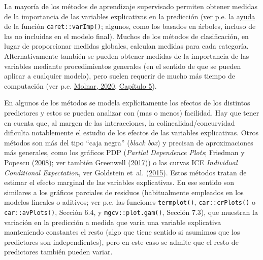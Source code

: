 \documentclass[
]{book}
\theoremstyle{break}
\theoremstyle{nonumberplain}
\begin{document}
La mayoría de los métodos de aprendizaje supervisado permiten obtener medidas de la importancia de las variables explicativas en la predicción (ver p.e. la \href{https://topepo.github.io/caret/variable-importance.html}{ayuda} de la función \texttt{caret::varImp()}; algunos, como los basados en árboles, incluso de las no incluidas en el modelo final).
Muchos de los métodos de clasificación, en lugar de proporcionar medidas globales, calculan medidas para cada categoría.
Alternativamente también se pueden obtener medidas de la importancia de las variables mediante procedimientos generales (en el sentido de que se pueden aplicar a cualquier modelo), pero suelen requerir de mucho más tiempo de computación (ver p.e. \href{https://christophm.github.io/interpretable-ml-book}{Molnar, 2020}, \href{https://christophm.github.io/interpretable-ml-book/agnostic.htm}{Capítulo 5}).

En algunos de los métodos se modela explícitamente los efectos de los distintos predictores y estos se pueden analizar con (mas o menos) facilidad.
Hay que tener en cuenta que, al margen de las interacciones, la colinealidad/concurvidad dificulta notablemente el estudio de los efectos de las variables explicativas.
Otros métodos son más del tipo ``caja negra'' (\emph{black box}) y precisan de aproximaciones más generales, como los gráficos PDP (\emph{Partial Dependence Plots}; Friedman y Popescu (\protect\hyperlink{ref-friedman2008predictive}{2008}); ver también Greenwell (\protect\hyperlink{ref-greenwell2020dblp}{2017})) o las curvas ICE \emph{Individual Conditional Expectation}, ver Goldstein et~al. (\protect\hyperlink{ref-goldstein2015peeking}{2015}).
Estos métodos tratan de estimar el efecto marginal de las variables explicativas.
En ese sentido son similares a los gráficos parciales de residuos (habitualmente empleados en los modelos lineales o aditivos; ver p.e. las funciones \texttt{termplot()}, \texttt{car::crPlots()} o \texttt{car::avPlots()}, Sección 6.4, y \texttt{mgcv::plot.gam()}, Sección 7.3), que muestran la variación en la predicción a medida que varía una variable explicativa manteniendo constantes el resto (algo que tiene sentido si asumimos que los predictores son independientes), pero en este caso se admite que el resto de predictores también pueden variar.
\end{document}
